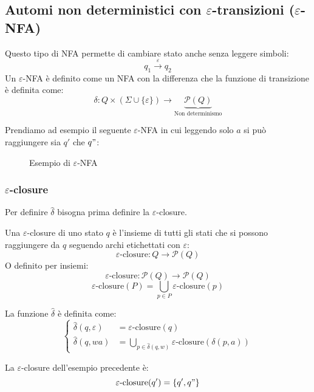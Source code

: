 \documentclass[a4paper]{article}
\begin{document}
\subsection{Automi non deterministici con \texorpdfstring{\( \varepsilon  \)}{epsilon}-transizioni (\texorpdfstring{\( \varepsilon  \)-NFA}{epsilon-NFA})}
Questo tipo di NFA permette di cambiare stato anche senza leggere simboli:
\[
  q_1 \stackrel{\varepsilon}{\to} q_2
\] 
Un \( \varepsilon \)-NFA è definito come un NFA con la differenza che la funzione di transizione
è definita come:
\[
  \delta: Q \times (\Sigma \cup \{\varepsilon\}) \to \underbrace{\mathcal{P}(Q)}_{\text{Non determinismo}}
\] 
\begin{example}
  Prendiamo ad esempio il seguente \( \varepsilon \)-NFA in cui leggendo solo \( a \) 
  si può raggiungere sia \( q' \) che \( q" \):
  \begin{figure}[H]
    \centering
    \caption{Esempio di \( \varepsilon \)-NFA}
  \end{figure}
\end{example}

\subsubsection{\texorpdfstring{\( \varepsilon  \)}{epsilon}-closure}
Per definire \( \hat{\delta} \) bisogna prima definire la \( \varepsilon \)-closure.

Una \( \varepsilon \)-closure di uno stato \( q \) è l'insieme di tutti gli stati
che si possono raggiungere da \( q \) seguendo archi etichettati con \( \varepsilon  \):
\[
  \varepsilon\text{-closure}: Q \to \mathcal{P}(Q)
\] 
O definito per insiemi:
\[
  \varepsilon\text{-closure}: \mathcal{P}(Q) \to \mathcal{P}(Q)
\] 
\[
  \varepsilon\text{-closure}(P) = \bigcup_{p \in P} \varepsilon\text{-closure}(p)
\] 

La funzione \( \hat{\delta} \) è definita come:
\[
  \begin{cases}
    \hat{\delta}(q, \varepsilon) &= \varepsilon\text{-closure}(q)\\
    \hat{\delta}(q, wa) &= \bigcup_{p \in \hat{\delta}(q,w)} \varepsilon\text{-closure}(\delta(p, a))
  \end{cases}
\] 
\begin{example}
  La \( \varepsilon \)-closure dell'esempio precedente è:
  \[
    \varepsilon\text{-closure}(q') = \{q', q"\}
  \] 
\end{example}
\end{document}
